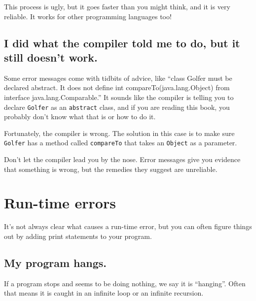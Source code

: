 \documentclass[12pt]{book}
\theoremstyle{exercise}
\newcommand{\java}[1]{\verb"#1"}
\begin{document}
This process is ugly, but it goes faster than you might think, and it is very reliable.
It works for other programming languages too!


\subsection*{I did what the compiler told me to do, but it still doesn't work.}

Some error messages come with tidbits of advice, like ``class Golfer must be declared abstract.
It does not define int compareTo(java.lang.Object) from interface java.lang.Comparable.''
It sounds like the compiler is telling you to declare \java{Golfer} as an \java{abstract} class, and if you are reading this book, you probably don't know what that is or how to do it.

Fortunately, the compiler is wrong.
The solution in this case is to make sure \java{Golfer} has a method called \java{compareTo} that takes an \java{Object} as a parameter.

Don't let the compiler lead you by the nose.
Error messages give you evidence that something is wrong, but the remedies they suggest are unreliable.


\section{Run-time errors}

It's not always clear what causes a run-time error, but you can often figure things out by adding print statements to your program.


\subsection*{My program hangs.}


If a program stops and seems to be doing nothing, we say it is ``hanging''.
Often that means it is caught in an infinite loop or an infinite recursion.
\end{document}
